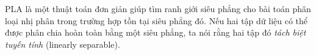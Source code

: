 PLA là một thuật toán đơn giản giúp tìm ranh giới siêu phẳng cho bài toán phân loại nhị phân trong trường hợp tồn tại siêu phẳng đó. Nếu hai tập dữ liệu có thể được phân chia hoàn toàn bằng một siêu phẳng, ta nói rằng hai tập đó \textit{tách biệt tuyến tính} ({linearly separable}).



